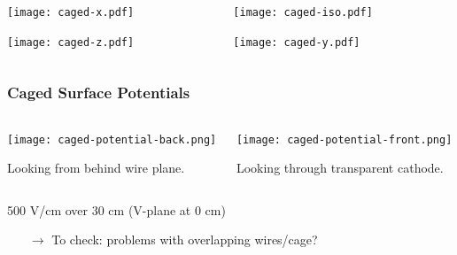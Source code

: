 \documentclass[xcolor=dvipsnames]{beamer}
\begin{document}
\begin{frame}
  \begin{columns}
    \begin{column}{0.5\textwidth}
      \texttt{[image: caged-x.pdf]}

      \texttt{[image: caged-z.pdf]}
    \end{column}
    \begin{column}{0.5\textwidth}
      \texttt{[image: caged-iso.pdf]}

      \texttt{[image: caged-y.pdf]}
    \end{column}
  \end{columns}
\end{frame}
\begin{frame}
  \frametitle{Caged Surface Potentials}
  \begin{columns}
    \begin{column}{0.5\textwidth}
      \begin{center}
        \texttt{[image: caged-potential-back.png]}

        \scriptsize Looking from behind wire plane.
      \end{center}
    \end{column}
    \begin{column}{0.5\textwidth}
      \begin{center}
        \texttt{[image: caged-potential-front.png]}

        \scriptsize Looking through transparent cathode.
      \end{center}
    \end{column}
  \end{columns}
  
  \begin{center}
      500 V/cm over 30 cm (V-plane at 0 cm)
  \end{center}

  \scriptsize
  \begin{itemize}
  \item[$\rightarrow$] To check: problems with overlapping wires/cage?
  \end{itemize}

\end{frame}
\end{document}
